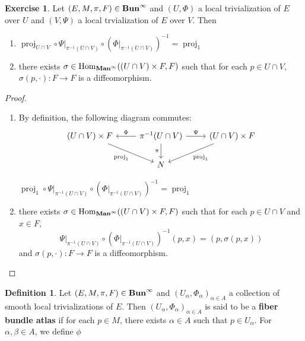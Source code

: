 \documentclass{book}
\theoremstyle{definition}
\newtheorem{defn}[definition]{Definition}
\newtheorem{ex}[definition]{Exercise}
\newcommand{\al}{\alpha}
\newcommand{\be}{\beta}
\newcommand{\sig}{\sigma}
\DeclareMathOperator{\Hom}{Hom}
\DeclareMathOperator{\prj}{\text{proj}}
\DeclareMathOperator*{\Maninf}{\text{\tbf{Man}}^{\infty}}
\DeclareMathOperator*{\Buninf}{\text{\tbf{Bun}}^{\infty}}
\DeclareMathOperator*{\0}{\mbf{0}}
\DeclareMathOperator*{\1}{\mbf{1}}
\newcommand{\tbf}[1]{\textbf{#1}}
\begin{document}
	\begin{ex}
		Let $(E, M, \pi, F) \in \Buninf$ and $(U, \Phi)$ a local trivialization of $E$ over $U$ and $(V, \Psi)$ a local trvialization of $E$ over $V$. Then 
		\begin{enumerate}
			\item $\prj_{U \cap V} \circ \Psi|_{\pi^{-1}(U \cap V)} \circ (\Phi|_{\pi^{-1}(U \cap V)})^{-1} = \prj_1$
			\item there exists $\sig \in \Hom_{\Maninf}(( U \cap V) \times F,  F)$ such that for each $p \in U \cap V$, $\sig(p, \cdot): F \rightarrow F$ is a diffeomorphism.
		\end{enumerate}
	\end{ex}

	\begin{proof}\
		\begin{enumerate}
			\item By definition, the following diagram commutes:
			\[ 
			\begin{tikzcd}
				(U \cap V) \times F  \arrow[dr, "\prj_{1}"'] & \pi^{-1}(U \cap V) \arrow[d, "{\pi}"'] \arrow[l, "{\Phi}"'] \arrow[r, "\Psi"] & (U \cap V) \times F \arrow[dl, "{\prj_1}"]  \\
													                & N
			\end{tikzcd}
			\] 
			
			$\prj_1 \circ \Psi|_{\pi^{-1}(U \cap V)} \circ (\Phi|_{\pi^{-1}(U \cap V)})^{-1} = \prj_1$
			\item there exists $\sig \in \Hom_{\Maninf}(( U \cap V) \times F,  F)$ such that for each $p \in U \cap V$ and $x \in F$, 
			$$\Psi|_{\pi^{-1}(U \cap V)} \circ (\Phi|_{\pi^{-1}(U \cap V)})^{-1}(p, x) = (p, \sig(p, x))$$ 
			and $\sig(p, \cdot): F \rightarrow F$ is a diffeomorphism.
		\end{enumerate}
	\end{proof}


	\begin{defn}
		Let $(E, M, \pi, F) \in \Buninf$ and $(U_{\al}, \Phi_{\al})_{\al \in A}$ a collection of smooth local trivializations of $E$. Then $(U_{\al}, \Phi_{\al})_{\al \in A}$ is said to be a \tbf{fiber bundle atlas} if for each $p \in M$, there exists $\al \in A$ such that $p \in U_{\al}$. For $\al, \be \in A$, we define $\phi_{}$
	\end{defn}
\end{document}
